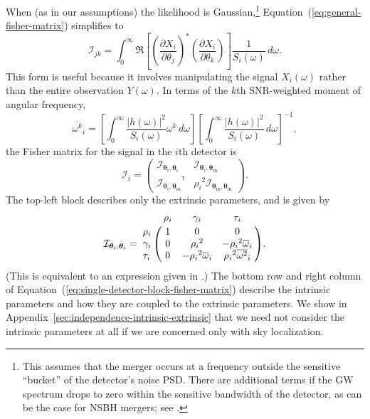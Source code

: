 \documentclass[amsmath,amssymb,aps,prx,reprint,nopreprintnumbers,nofootinbib]{revtex4-1}
\newcommand\transpose{\ensuremath{^{^\mathsf{T}}}}
\begin{document}
When (as in our assumptions) the likelihood is Gaussian,\footnote{This assumes that the merger occurs at a frequency outside the sensitive ``bucket'' of the detector's noise \ac{PSD}. There are additional terms if the \ac{GW} spectrum drops to zero within the sensitive bandwidth of the detector, as can be the case for \ac{NSBH} mergers; see \cite{2014CQGra..31o5005M}.} Equation~(\ref{eq:general-fisher-matrix}) simplifies to
%
\begin{equation}\label{eq:gaussian-fisher-matrix}
    \mathcal{I}_{jk} = \int_0^\infty \Re \left[
        \left(\frac{\partial X_i}{\partial \theta_j}\right)^*
        \left(\frac{\partial X_i}{\partial \theta_k}\right)
    \right] \frac{1}{S_i(\omega)} \, d\omega.
\end{equation}
%
This form is useful because it involves manipulating the signal $X_i (\omega)$ rather than the entire observation $Y (\omega)$. In terms of the $k$th \ac{SNR}-weighted moment of angular frequency,
%
\begin{equation}\label{eq:angular-frequency-moments}
    {\overline{\omega^k}}_i =
        \left[ \int_0^\infty \frac{|h (\omega)|^2}{S_i(\omega)} \omega^k \, d\omega \right]
        \left[ \int_0^\infty \frac{|h (\omega)|^2}{S_i(\omega)} \, d\omega \right]^{-1},
\end{equation}
%
the Fisher matrix for the signal in the $i$th detector is
%
\begin{equation}
    \label{eq:single-detector-block-fisher-matrix}
    \mathcal{I}_i = \left(
        \begin{array}{cc}
            \mathcal{I}_{\bm\theta_i,\bm\theta_i} &
            \mathcal{I}_{\bm\theta_i,\bm\theta_\mathrm{in}} \\
            {\mathcal{I}_{\bm\theta_i,\bm\theta_\mathrm{in}}}\transpose &
            {\rho_i}^2 \mathcal{I}_{\bm\theta_\mathrm{in},\bm\theta_\mathrm{in}}
        \end{array}
    \right).
\end{equation}
%
The top-left block describes only the extrinsic parameters, and is given by
%
\begin{equation}\label{eq:fisher-matrix}
    \mathcal{I}_{\bm\theta_i,\bm\theta_i} = \bordermatrix{
        ~ & \rho_i & \gamma_i & \tau_i \cr
        \rho_i & 1 & 0 & 0 \cr
        \gamma_i & 0 & {\rho_i}^2 & -{\rho_i}^2 {\overline{\omega}}_i \cr
        \tau_i & 0 & -{\rho_i}^2 {\overline{\omega}}_i & {\rho_i}^2 {\overline{\omega^2}}_i
    }.
\end{equation}
%
(This is equivalent to an expression given in \cite{Grover:2013}.) The bottom row and right column of Equation~(\ref{eq:single-detector-block-fisher-matrix}) describe the intrinsic parameters and how they are coupled to the extrinsic parameters. We show in Appendix~\ref{sec:independence-intrinsic-extrinsic} that we need not consider the intrinsic parameters at all if we are concerned only with sky localization.
\end{document}
